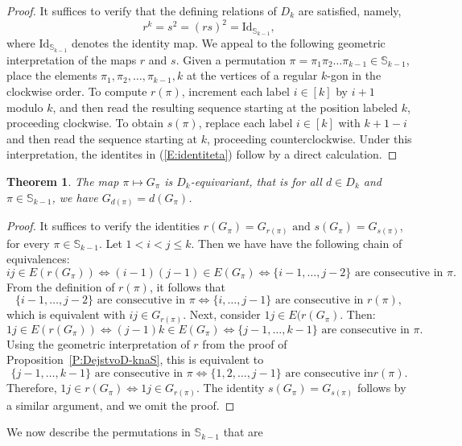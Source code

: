 \documentclass{birkjour}
\newtheorem{thm}{Theorem}[section]
\theoremstyle{definition}
\theoremstyle{remark}
\numberwithin{equation}{section}
\begin{document}
\begin{proof} It suffices to verify that
the defining relations of $D_k$ are satisfied, namely,
\begin{equation}\label{E:identiteta}
r^k=s^2=(rs)^2=\mathrm{Id}_{\mathbb S_{k-1}},
\end{equation} where $\mathrm{Id}_{\mathbb S_{k-1}}$
denotes the identity map. We appeal to the following geometric
interpretation of the maps $r$ and $s$. Given a permutation
$\pi=\pi_1\pi_2\ldots\pi_{k-1}\in \mathbb{S}_{k-1}$, place the
elements $\pi_1,\pi_2,\ldots,\pi_{k-1},k$ at the vertices of a
regular $k$-gon in the clockwise order. To compute $r(\pi)$,
 increment each label $i\in[k]$ by $i+1$ modulo $k$, and then read the
resulting sequence starting at the position labeled $k$,
proceeding clockwise. To obtain $s(\pi)$, replace each label
$i\in[k]$ with $k+1-i$ and then read the sequence starting at $k$,
proceeding counterclockwise. Under this interpretation, the
identites in (\ref{E:identiteta}) follow by a direct calculation.
\end{proof}
\begin{thm} The map $\pi\mapsto G_\pi$ is $D_k$-equivariant,
that is for all $d\in D_k$ and $\pi\in \mathbb{S}_{k-1}$, we have
$G_{d(\pi)}=d(G_\pi)$.
\end{thm}
\begin{proof} It suffices to verify the identities
$r(G_\pi)=G_{r(\pi)}\textrm{ and }s(G_\pi)=G_{s(\pi)}$, for every
$ \pi\in\mathbb S_{k-1}.$ Let $1<i<j\leq k$. Then we have have the
following chain of equivalences:
$$ij\in E(r(G_\pi)) \Leftrightarrow (i-1)(j-1)\in E(G_\pi)
\Leftrightarrow\{i-1,\ldots,j-2\} \textrm{ are consecutive in }
\pi.$$ From the definition of $r(\pi)$, it follows that
$$\{i-1,\ldots,j-2\} \textrm{ are consecutive in }
\pi\Leftrightarrow \{i,\ldots,j-1\} \textrm{ are consecutive in }
r(\pi),$$ which is equivalent with $ij\in G_{r(\pi)}$. Next,
consider $1j\in E(r(G_\pi)$. Then:
$$1j\in E(r(G_\pi)) \Leftrightarrow (j-1)k\in E(G_\pi)
\Leftrightarrow\{j-1,\ldots,k-1\} \textrm{ are consecutive in }
\pi.$$ Using the geometric interpretation of $r$ from the proof of
Proposition~\ref{P:DejstvoD-knaS}, this is equivalent to
$$\{j-1,\ldots,k-1\} \textrm{ are consecutive in }
\pi\Leftrightarrow \{1,2,\ldots,j-1\} \textrm{ are consecutive in
} r(\pi).$$ Therefore, $1j\in r(G_\pi)\Leftrightarrow 1j\in
G_{r(\pi)}$. The identity $s(G_\pi)=G_{s(\pi)}$ follows by a
similar argument, and we omit the proof.
\end{proof}
We now describe the permutations in $\mathbb{S}_{k-1}$ that are
\end{document}
